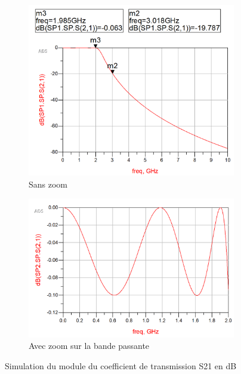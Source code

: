 \documentclass[french]{article}
\begin{document}
\begin{figure}[H]
	\centering
	\begin{subfigure}[b]{0.49\textwidth}
		\includegraphics[width=\textwidth]{photo/passe_bas_vic/simu_passe_bas_localise.PNG}
		\caption{Sans zoom}
		\label{fig:simu_passe_bas_localise}
	\end{subfigure}
	\begin{subfigure}[b]{0.49\textwidth}
		\includegraphics[width=\textwidth]{photo/passe_bas_vic/simu_zoom_passe_bas_localise.PNG}
		\caption{Avec zoom sur la bande passante}
		\label{fig:simu_zoom_passe_bas_localise}
	\end{subfigure}
	\caption{Simulation du module du coefficient de transmission S21 en dB}
\end{figure}
\end{document}
